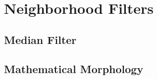



\section{Neighborhood Filters}
\label{sec:NeighborhoodFilters}

\subsection{Median Filter}
\label{sec:MedianFilter}




\subsection{Mathematical Morphology}
\label{sec:MathematicalMorphology}


